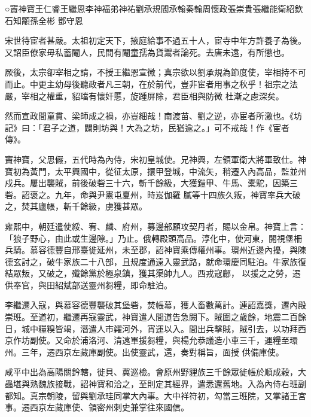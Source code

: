
\begin{pinyinscope}

 ○竇神寶王仁睿王繼恩李神福弟神祐劉承規閻承翰秦翰周懷政張崇貴張繼能衛紹欽石知顒孫全彬
 鄧守恩



 宋世待宦者甚嚴。太祖初定天下，掖庭給事不過五十人，宦寺中年方許養子為後。又詔臣僚家毋私蓄閹人，民間有閹童孺為貨鬻者論死。去唐未遠，有所懲也。



 厥後，太宗卻宰相之請，不授王繼恩宣徽；真宗欲以劉承規為節度使，宰相持不可而止。中更主幼母後聽政者凡三朝，在於前代，豈非宦者用事之秋乎！祖宗之法嚴，宰相之權重，貂璫有懷奸慝，旋踵屏除，君臣相與防微
 杜漸之慮深矣。



 然而宣政間童貫、梁師成之禍，亦豈細哉！南渡苗、劉之逆，亦宦者所激也。《坊記》曰：「君子之道，闢則坊與！大為之坊，民猶逾之。」可不戒哉！作《宦者傳》。



 竇神寶，父思儼，五代時為內侍，宋初皇城使。兄神興，左領軍衛大將軍致仕。神寶初為黃門，太平興國中，從征太原，擐甲登城，中流矢，稍遷入內高品，監並州戍兵。屢出襲賊，前後破砦三十六，斬千餘級，大獲鎧甲、牛馬、橐駝，因築三砦。詔褒之。九年，命與尹憲屯夏州，時岌伽羅
 膩等十四族久叛，神寶率兵大破之，焚其廬帳，斬千餘級，虜獲甚眾。



 雍熙中，朝廷遣使綏、宥、麟、府州，募邊部願攻契丹者，賜以金帛。神寶上言：「狼子野心，由此或生邊隙。」乃止。俄轉殿頭高品。淳化中，使河東，閱視堡柵兵騎。慕容德豐自邢臺徙延州，未至郡，詔神寶乘傳權州事。環州近邊內擾，與陳德玄討之，破牛家族二十八部，且規度通遠入靈武路，就命環慶同駐泊。牛家族復結眾叛，又破之，殲餘黨於極泉鎮，獲其渠帥九人。西戎寇鄜，
 以援之之勞，遷供奉官，與田紹斌部送靈州芻糧，即命駐泊。



 李繼遷入寇，與慕容德豐襲破其堡砦，焚帳幕，獲人畜數萬計。連詔嘉獎，遷內殿崇班。至道初，繼遷再寇靈武，神寶遣人間道告急闕下。賊圍之歲餘，地震二百餘日，城中糧糗皆竭，潛遣人市糴河外，宵運以入。間出兵擊賊，賊引去，以功拜西京作坊副使。又命於浦洛河、清遠軍援芻糧，與楊允恭議造小車三千，運糧至環州。三年，遷西京左藏庫副使。出使靈武，還，奏對稱旨，面授
 供備庫使。



 咸平中出為高陽關鈐轄，徙貝、冀巡檢。會原州野貍族三千餘眾徙帳於順成穀，大蟲堪與熟魏族接戰，詔神寶和洽之，至則定其經界，遣悉還舊地。入為內侍右班副都知。真宗朝陵，留與劉承珪同掌大內事。大中祥符初，勾當三班院，又掌諸王宮事。遷西京左藏庫使、領密州刺史兼掌往來國信。




\end{pinyinscope}
